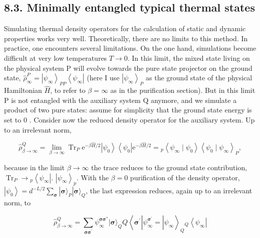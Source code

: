 \documentclass[12pt]{article}
\begin{document}
\subsection*{8.3. Minimally entangled typical thermal states}
Simulating thermal density operators for the calculation of static and dynamic properties works very well. Theoretically, there are no limits to this method. In practice, one encounters several limitations. On the one hand, simulations become difficult at very low temperatures $T \rightarrow 0$. In this limit, the mixed state living on the physical system $\mathrm{P}$ will evolve towards the pure state projector on the ground state, $\hat{\rho}_{\infty}^{P}=\left|\psi_{\infty}\right\rangle_{P P}\left\langle\psi_{\infty}\right|$ (here I use $\left|\psi_{\infty}\right\rangle_{P}$ as the ground state of the physical Hamiltonian $\hat{H}$, to refer to $\beta=\infty$ as in the purification section). But in this limit $\mathrm{P}$ is not entangled with the auxiliary system $\mathrm{Q}$ anymore, and we simulate a product of two pure states: assume for simplicity that the ground state energy is set to 0 . Consider now the reduced density operator for the auxiliary system. Up to an irrelevant norm,


\begin{equation*}
\hat{\rho}_{\beta \rightarrow \infty}^{Q}=\lim _{\beta \rightarrow \infty} \operatorname{Tr}_{P} \mathrm{e}^{-\beta \hat{H} / 2}\left|\psi_{0}\right\rangle\left\langle\psi_{0}\right| \mathrm{e}^{-\beta \hat{H} / 2}={ }_{p}\left\langle\psi_{\infty} \mid \psi_{0}\right\rangle\left\langle\psi_{0} \mid \psi_{\infty}\right\rangle_{P}, \tag{297}
\end{equation*}


because in the limit $\beta \rightarrow \infty$ the trace reduces to the ground state contribution, $\operatorname{Tr}_{P} \rightarrow{ }_{p}\left\langle\psi_{\infty}\right|$. $\left|\psi_{\infty}\right\rangle_{p}$. With the $\beta=0$ purification of the density operator, $\left|\psi_{0}\right\rangle=d^{-L / 2} \sum_{\boldsymbol{\sigma}}|\boldsymbol{\sigma}\rangle_{P}|\boldsymbol{\sigma}\rangle_{Q}$, the last expression reduces, again up to an irrelevant norm, to


\begin{equation*}
\hat{\rho}_{\beta \rightarrow \infty}^{Q}=\sum_{\boldsymbol{\sigma} \boldsymbol{\sigma}^{\prime}} \psi_{\infty}^{\boldsymbol{\sigma} \boldsymbol{\sigma}^{*}}|\boldsymbol{\sigma}\rangle_{Q} Q\left\langle\boldsymbol{\sigma}^{\prime}\left|\psi_{\infty}^{\boldsymbol{\sigma}^{\prime}}=\right| \psi_{\infty}\right\rangle_{Q}{ }_{Q}\left\langle\psi_{\infty}\right| \tag{298}
\end{equation*}
\end{document}

